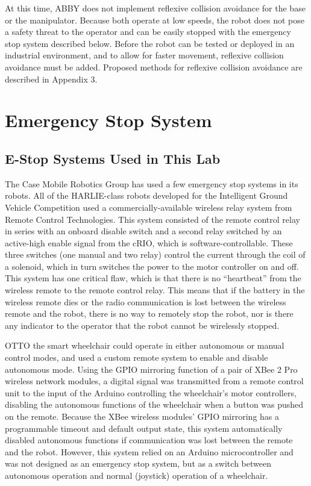 \documentclass[]{cwru} %
\begin{document}
At this time, ABBY does not implement reflexive collision avoidance for
the base or the manipulator. Because both operate at low speeds, the
robot does not pose a safety threat to the operator and can be easily
stopped with the emergency stop system described below. Before the robot
can be tested or deployed in an industrial environment, and to allow for
faster movement, reflexive collision avoidance must be added. Proposed
methods for reflexive collision avoidance are described in Appendix
3.

\section{Emergency Stop System}

\subsection{E-Stop Systems Used in This Lab}

The Case Mobile Robotics Group has used a few emergency stop systems in
its robots. All of the HARLIE-class robots developed for the Intelligent
Ground Vehicle Competition used a commercially-available wireless relay
system from Remote Control Technologies. This system consisted of the
remote control relay in series with an onboard disable switch and a
second relay switched by an active-high enable signal from the cRIO,
which is software-controllable. These three switches (one manual and two
relay) control the current through the coil of a solenoid, which in turn
switches the power to the motor controller on and off. This system has
one critical flaw, which is that there is no ``heartbeat'' from the
wireless remote to the remote control relay. This means that if the
battery in the wireless remote dies or the radio communication is lost
between the wireless remote and the robot, there is no way to remotely
stop the robot, nor is there any indicator to the operator that the
robot cannot be wirelessly stopped.

OTTO the smart wheelchair could operate in either autonomous or manual
control modes, and used a custom remote system to enable and disable
autonomous mode. Using the GPIO mirroring function of a pair of XBee 2
Pro wireless network modules, a digital signal was transmitted from a
remote control unit to the input of the Arduino controlling the
wheelchair's motor controllers, disabling the autonomous functions of
the wheelchair when a button was pushed on the remote. Because the XBee
wireless modules' GPIO mirroring has a programmable timeout and default
output state, this system automatically disabled autonomous functions if
communication was lost between the remote and the robot. However, this
system relied on an Arduino microcontroller and was not designed as an
emergency stop system, but as a switch between autonomous operation and
normal (joystick) operation of a wheelchair.
\end{document}
